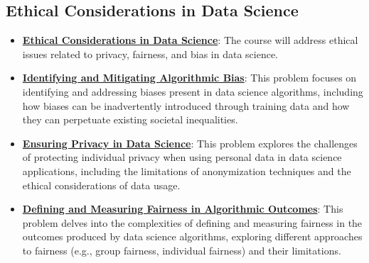 \documentclass{article}%
\begin{document}
%
\subsection{Ethical Considerations in Data Science}%
\label{subsec:EthicalConsiderationsinDataScience}%
\begin{itemize}[leftmargin=*]%
\item \href{https://purdue.brightspace.com/d2l/common/assets/pdfjs-d2l-dist/1.0.14-legacy/web/viewer.html?file=\%2Fcontent\%2Fenforced\%2F1095465-WL.202510.CS24200.LE1\%2F01L1-introduction.pdf\%3Fou\%3D1095465\&lang=en-us\&container=d2l-fileviewer-rendered-pdf\&fullscreen=d2l-fileviewer-rendered-pdf-dialog\&height=667#page=4}{\textbf{Ethical Considerations in Data Science}}: The course will address ethical issues related to privacy, fairness, and bias in data science.%
\item \href{https://purdue.brightspace.com/d2l/common/assets/pdfjs-d2l-dist/1.0.14-legacy/web/viewer.html?file=\%2Fcontent\%2Fenforced\%2F1095465-WL.202510.CS24200.LE1\%2F25-ethics.pdf\%3Fou\%3D1095465\&lang=en-us\&container=d2l-fileviewer-rendered-pdf\&fullscreen=d2l-fileviewer-rendered-pdf-dialog\&height=667#page=2}{\textbf{Identifying and Mitigating Algorithmic Bias}}: This problem focuses on identifying and addressing biases present in data science algorithms, including how biases can be inadvertently introduced through training data and how they can perpetuate existing societal inequalities.%
\item \href{https://purdue.brightspace.com/d2l/common/assets/pdfjs-d2l-dist/1.0.14-legacy/web/viewer.html?file=\%2Fcontent\%2Fenforced\%2F1095465-WL.202510.CS24200.LE1\%2F25-ethics.pdf\%3Fou\%3D1095465\&lang=en-us\&container=d2l-fileviewer-rendered-pdf\&fullscreen=d2l-fileviewer-rendered-pdf-dialog\&height=667#page=8}{\textbf{Ensuring Privacy in Data Science}}: This problem explores the challenges of protecting individual privacy when using personal data in data science applications, including the limitations of anonymization techniques and the ethical considerations of data usage.%
\item \href{https://purdue.brightspace.com/d2l/common/assets/pdfjs-d2l-dist/1.0.14-legacy/web/viewer.html?file=\%2Fcontent\%2Fenforced\%2F1095465-WL.202510.CS24200.LE1\%2F25-ethics.pdf\%3Fou\%3D1095465\&lang=en-us\&container=d2l-fileviewer-rendered-pdf\&fullscreen=d2l-fileviewer-rendered-pdf-dialog\&height=667#page=24}{\textbf{Defining and Measuring Fairness in Algorithmic Outcomes}}: This problem delves into the complexities of defining and measuring fairness in the outcomes produced by data science algorithms, exploring different approaches to fairness (e.g., group fairness, individual fairness) and their limitations.%
\end{itemize}
\end{document}
